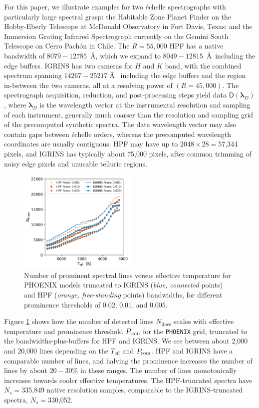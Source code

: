\documentclass[modern]{aastex631}
\begin{document}
For this paper, we illustrate examples for two \'echelle spectrographs with particularly large spectral grasp: the Habitable Zone Planet Finder \citep[HPF,][]{2014SPIE.9147E..1GM} on the Hobby-Eberly Telescope at McDonald Observatory in Fort Davis, Texas; and the Immersion Grating Infrared Spectrograph \citep[IGRINS,][]{park14}
currently on the Gemini South Telescope on Cerro Pach\'on in Chile. The $R=55,000$ HPF has a native bandwidth of $8079-12785$~\AA, which we expand to $8049-12815$~\AA~including the edge buffers. IGRINS has two cameras for $H$ and $K$ band, with the combined spectrum spanning $14267-25217\;$\AA~ including the edge buffers and the region in-between the two cameras, all at a resolving power of $(R=45,000)$. The spectrograph acquisition, reduction, and post-processing steps yield data $\mathsf{D}(\bm{\lambda}_{D})$, where $\bm{\lambda}_{D}$ is the wavelength vector at the instrumental resolution and sampling of each instrument, generally much coarser than the resolution and sampling grid of the precomputed synthetic spectra. The data wavelength vector may also contain gaps between \'echelle orders, whereas the precomputed wavelength coordinates are usually contiguous. HPF may have up to $2048\times28=$57,344 pixels, and IGRINS has typically about 75,000 pixels, after common trimming of noisy edge pixels and unusable telluric regions.


\begin{figure}[hbt!]
    \centering
    \includegraphics[width=0.5\textwidth]{figures/N_lines_vs_Teff_prom.png}
    \caption{Number of prominent spectral lines versus effective temperature for PHOENIX models truncated to IGRINS (\emph{blue, connected} points) and HPF (\emph{orange, free-standing} points) bandwidths, for different prominence thresholds of $0.02$, $0.01$, and $0.005$.}
    \label{fig_Nlines_vs_teff}
\end{figure}


Figure \ref{fig_Nlines_vs_teff} shows how the number of detected lines $N_{\mathrm{lines}}$ scales with effective temperature and prominence threshold $P_{\rm rom}$ for the \texttt{PHOENIX} grid, truncated to the bandwidths-plus-buffers for HPF and IGRINS. We see between about 2,000 and 20,000 lines depending on the $T_{\mathrm{eff}}$ and $P_{\rm rom}$. HPF and IGRINS have a comparable number of lines, and halving the prominence increases the number of lines by about $20-30\%$ in these ranges. The number of lines monotonically increases towards cooler effective temperatures.
The HPF-truncated spectra have $N_s=$335,849 native resolution samples, comparable to the IGRINS-truncated spectra, $N_s=$330,052.
\end{document}
